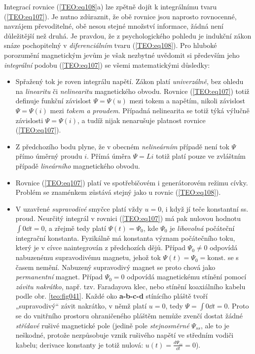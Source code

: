     Integrací rovnice (\ref{TEO:eq108}a) lze zpětně dojít k integrálnímu tvaru
    (\ref{TEO:eq107}). Je nutno zdůraznit, že obě rovnice jsou naprosto rovnocenné, navzájem
    převoditelné, obě nesou stejné množství informace, žádná není důležitější než druhá. Je
    pravdou, že z psychologického pohledu je indukční zákon snáze pochopitelný v
    \emph{diferenciálním} tvaru (\ref{TEO:eq108}). Pro hluboké porozumění magnetickým jevům
    je však nezbytné uvědomit si především jeho \emph{integrální} podobu (\ref{TEO:eq107})
    se všemi matematickými důsledky:
    \begin{itemize}
      \item Spřažený tok je roven integrálu napětí. Zákon platí \emph{univerzálně}, bez ohledu na
            \emph{linearitu} či \emph{nelinearitu} magnetického obvodu. Rovnice
            (\ref{TEO:eq107}) totiž definuje funkční závislost \(\Psi=\Psi(u)\) mezi tokem a
            napětím, nikoli závislost \(\Psi=\Psi(i)\) mezi \emph{tokem a proudem}.  Případná
            nelinearita se totiž týká výlučně závislosti \(\Psi=\Psi(i)\), a tudíž nijak nenarušuje
            platnost rovnice (\ref{TEO:eq107}).
      \item Z předchozího bodu plyne, že v obecném \emph{nelineárním} případě není tok \(\Psi\)
            přímo úměrný proudu \(i\). Přímá úměra \(\Psi = Li\) totiž platí pouze ve zvláštním
            případě \emph{lineárního} magnetického obvodu.
      \item Rovnice (\ref{TEO:eq107}) platí ve spotřebičovém i generátorovém režimu cívky.
            Problém se znaménkem zůstává stejný jako u rovnic (\ref{TEO:eq108}).
      \item V uzavřené \emph{supravodivé} smyčce platí vždy \(u = 0\), i když jí teče konstantní
            ss. proud. Neurčitý integrál v rovnici (\ref{TEO:eq107}) má pak nulovou hodnotu
            \(\int0\dd{t}=0\), a zřejmě tedy platí \(\Psi(t)=\Psi_0\), kde \(\Psi_0\) je
            \emph{libovolná} počáteční integrační konstanta. Fyzikálně má konstanta význam
            počátečního toku, který je v cívce naintegrován z předchozích dějů. Případ
            \(\Psi_0\neq0\) odpovídá nabuzenému supravodivému magnetu, jehož tok \(\Psi(t)=\Psi_0
            = \text{konst.}\) se s časem nemění. Nabuzený supravodivý magnet se proto chová jako
            \emph{permanentní} magnet. Případ \(\Psi_0 = 0\) odpovídá magnetickému stínění pomocí
            \emph{závitu nakrátko}, např. tzv. Faradayova klec, nebo stínění koaxiálního kabelu
            podle obr. \ref{teo:fig041}. Každé oko \textbf{a-b-c-d} stínícího pláště
            tvoří „supravodivý“ závit nakrátko, v němž platí \(u = 0\), tedy \(\Psi=\int0\dd{t}=0\).
            Proto se do vnitřního prostoru ohraničeného pláštěm nemůže zvenčí dostat žádné
            \emph{střídavé} rušivé magnetické pole (jedině pole \emph{stejnosměrné} \(\Psi_{ss}\),
            ale to je neškodné, protože nezpůsobuje vznik rušivého napětí ve středním vodiči
            kabelu; derivace konstanty je totiž nulová: \(u(t)=\frac{d\Psi_{ss}}{\dd{t}}=0\)).
    \end{itemize}

